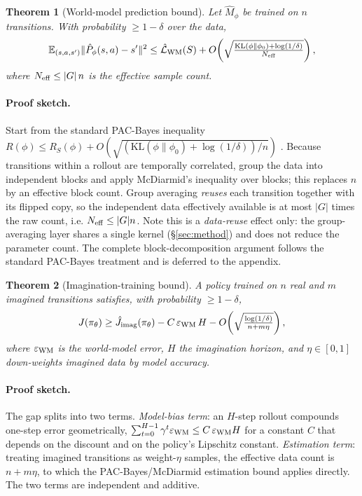 \documentclass[sigconf,anonymous]{acmart}
\newtheorem{theorem}{Theorem}
\begin{document}
\begin{theorem}[World-model prediction bound]\label{th:wm}
Let $\hat M_\phi$ be trained on $n$ transitions. With probability
$\ge1-\delta$ over the data,
\[
  \mathbb E_{(s,a,s')}\|\hat P_\phi(s,a)-s'\|^2
  \le \hat{\mathcal L}_{\rm WM}(S)+
  O\!\left(\sqrt{\tfrac{\mathrm{KL}(\phi\|\phi_0)+\log(1/\delta)}{N_{\rm eff}}}\right),
\]
where $N_{\rm eff}\le |G|\,n$ is the effective sample count.
\end{theorem}

\paragraph{Proof sketch.}
Start from the standard PAC-Bayes inequality
$R(\phi)\le R_S(\phi)+O(\sqrt{(\mathrm{KL}(\phi\|\phi_0)+\log(1/\delta))/n})$
\cite{mcallester1999}. Because transitions within a rollout are temporally
correlated, group the data into independent blocks and apply
McDiarmid's inequality over blocks; this replaces $n$ by an effective block
count. Group averaging \emph{reuses} each transition together with its
flipped copy, so the independent data effectively available is at most
$|G|$ times the raw count, i.e. $N_{\rm eff}\le |G|n$. Note this is a
\emph{data-reuse} effect only: the group-averaging layer shares a single
kernel (\S\ref{sec:method}) and does not reduce the parameter count. The
complete block-decomposition argument follows the standard PAC-Bayes
treatment and is deferred to the appendix.

\begin{theorem}[Imagination-training bound]\label{th:imag}
A policy trained on $n$ real and $m$ imagined transitions satisfies, with
probability $\ge1-\delta$,
\[
  J(\pi_\theta)\ge \hat J_{\rm imag}(\pi_\theta)
  -C\,\varepsilon_{\rm WM}\,H
  -O\!\left(\sqrt{\tfrac{\log(1/\delta)}{n+m\eta}}\right),
\]
where $\varepsilon_{\rm WM}$ is the world-model error, $H$ the imagination
horizon, and $\eta\in[0,1]$ down-weights imagined data by model accuracy.
\end{theorem}

\paragraph{Proof sketch.}
The gap splits into two terms. \emph{Model-bias term}: an $H$-step rollout
compounds one-step error geometrically,
$\sum_{t=0}^{H-1}\gamma^t\varepsilon_{\rm WM}\le C\,\varepsilon_{\rm WM}H$
for a constant $C$ that depends on the discount and on the policy's Lipschitz
constant. \emph{Estimation term}: treating imagined transitions as
weight-$\eta$ samples, the effective data count is $n+m\eta$, to which the
PAC-Bayes/McDiarmid estimation bound applies directly. The two terms are
independent and additive.
\end{document}
